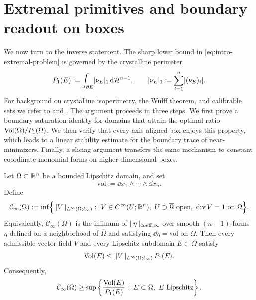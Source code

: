 \section{Extremal primitives and boundary readout on boxes}

We now turn to the inverse statement. The sharp lower bound in
\eqref{eq:intro-extremal-problem} is governed by the crystalline perimeter
\[
P_1(E):=\int_{\partial E}\lvert \nu_E \rvert_1\,\mathrm{d}\mathcal{H}^{n-1},
\qquad
\lvert \nu_E \rvert_1:=\sum_{i=1}^n \lvert (\nu_E)_i \rvert.
\]
For background on crystalline isoperimetry, the Wulff theorem, and calibrable
sets we refer to
\cite{Taylor1978,Fonseca1991,FonsecaMuller1991,DacorognaPfister1992,
FigalliZhang2022,DeMason2024} and
\cite{Strang1983,Nozawa1990,Grieser2006,Strang2010,
CasellesFaccioloMeinhardt2009,CasellesChambolleMollNovaga2008,
Leonardi2015,Parini2011}. The argument proceeds in three steps. We first prove
a boundary saturation identity for domains that attain the optimal ratio
$\operatorname{Vol}(\Omega)/P_1(\Omega)$. We then verify that every axis-aligned box enjoys
this property, which leads to a linear stability estimate for the boundary
trace of near-minimizers. Finally, a slicing argument transfers the same
mechanism to constant coordinate-monomial forms on higher-dimensional boxes.

\begin{lemma}
\label{lem:boundary-calibration}
Let $\Omega\subset\mathbb{R}^n$ be a bounded Lipschitz domain, and set
\[
\mathrm{vol}:=\dd x_1\wedge\cdots\wedge \dd x_n.
\]
Define
\[
\mathcal C_\infty(\Omega):=
\inf\Bigl\{
\norm{V}_{L^\infty(\Omega;\ell_\infty)}:\ 
V\in C^\infty(U;\RR^n),\ U\supset\overline{\Omega}\text{ open},
\ \Div V=1\text{ on }\Omega
\Bigr\}.
\]
Equivalently, $\mathcal C_\infty(\Omega)$ is the infimum of
$\lVert \eta \rVert_{\mathrm{coeff},\infty}$ over smooth $(n-1)$-forms $\eta$ defined on a
neighborhood of $\overline{\Omega}$ and satisfying $\dd\eta=\mathrm{vol}$ on
$\Omega$. Then every admissible vector field $V$ and every Lipschitz subdomain
$E\subset\Omega$ satisfy
\[
\operatorname{Vol}(E)\le \lVert V \rVert_{L^\infty(\Omega;\ell_\infty)}\,P_1(E).
\]
Consequently,
\[
\mathcal C_\infty(\Omega)\ge
\sup\left\{
\frac{\operatorname{Vol}(E)}{P_1(E)}:\ E\subset\Omega,\ E\text{ Lipschitz}
\right\}.
\]
\end{lemma}

